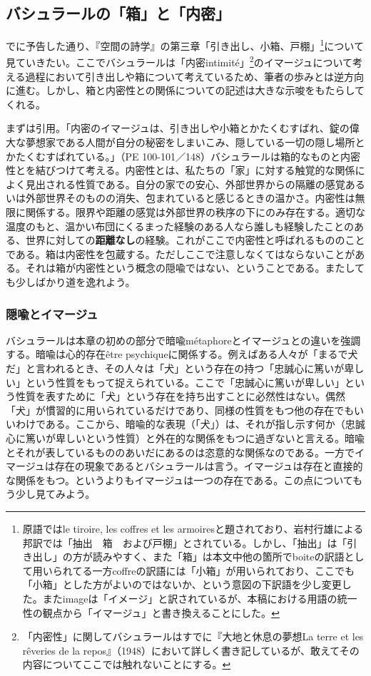 \documentclass[b5j,twoside,twocolumn]{utarticle}
\begin{document}
\subsection{バシュラールの「箱」と「内密」}
でに予告した通り、『空間の詩学』の第三章「引き出し、小箱、戸棚」\footnote{原語ではle tiroire, les coffres et les armoiresと題されており、岩村行雄による邦訳では「抽出　箱　および戸棚」とされている。しかし、「抽出」は「引き出し」の方が読みやすく、また「箱」は本文中他の箇所でboiteの訳語として用いられてる一方coffreの訳語には「小箱」が用いられており、ここでも「小箱」とした方がよいのではないか、という意図の下訳語を少し変更した。またimageは「イメージ」と訳されているが、本稿における用語の統一性の観点から「イマージュ」と書き換えることにした。}について見ていきたい。ここでバシュラールは「内密intimité」\footnote{「内密性」に関してバシュラールはすでに『大地と休息の夢想La terre et les rêveries de la repos』（1948）において詳しく書き記しているが、敢えてその内容についてここでは触れないことにする。}のイマージュについて考える過程において引き出しや箱について考えているため、筆者の歩みとは逆方向に進む。しかし、箱と内密性との関係についての記述は大きな示唆をもたらしてくれる。


まずは引用。「内密のイマージュは、引き出しや小箱とかたくむすばれ、錠の偉大な夢想家である人間が自分の秘密をしまいこみ、隠している一切の隠し場所とかたくむすばれている。」（PE 100-101／148）バシュラールは箱的なものと内密性とを結びつけて考える。内密性とは、私たちの「家」に対する触覚的な関係によく見出される性質である。自分の家での安心、外部世界からの隔離の感覚あるいは外部世界そのものの消失、包まれていると感じるときの温かさ。内密性は無限に関係する。限界や距離の感覚は外部世界の秩序の下にのみ存在する。適切な温度のもと、温かい布団にくるまった経験のある人なら誰しも経験したことのある、世界に対しての\textbf{距離なし}の経験。これがここで内密性と呼ばれるもののことである。箱は内密性を包蔵する。ただしここで注意しなくてはならないことがある。それは箱が内密性という概念の隠喩ではない、ということである。またしても少しばかり道を逸れよう。
\subsubsection{隠喩とイマージュ}
バシュラールは本章の初めの部分で暗喩métaphoreとイマージュとの違いを強調する。暗喩は心的存在être psychiqueに関係する。例えばある人々が「まるで犬だ」と言われるとき、その人々は「犬」という存在の持つ「忠誠心に篤いが卑しい」という性質をもって捉えられている。ここで「忠誠心に篤いが卑しい」という性質を表すために「犬」という存在を持ち出すことに必然性はない。偶然「犬」が慣習的に用いられているだけであり、同様の性質をもつ他の存在でもいいわけである。ここから、暗喩的な表現（「犬」）は、それが指し示す何か（忠誠心に篤いが卑しいという性質）と外在的な関係をもつに過ぎないと言える。暗喩とそれが表しているもののあいだにあるのは恣意的な関係なのである。一方でイマージュは存在の現象であるとバシュラールは言う。イマージュは存在と直接的な関係をもつ。というよりもイマージュは一つの存在である。この点についてもう少し見てみよう。
\end{document}
